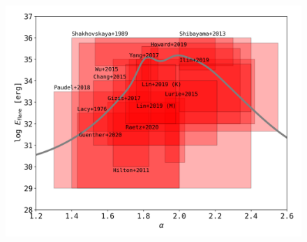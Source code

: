 \documentclass{aa}
\begin{document}
\begin{appendix}
   \begin{figure}
   \centering
            \includegraphics[width=\hsize]{pics/appendix/overview_alpha_literature.png}

\end{figure}
\end{appendix}
\end{document}
